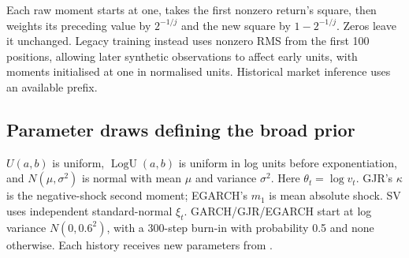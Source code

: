 Each raw moment starts at one, takes the first nonzero return's square, then weights its preceding value by $2^{-1/j}$ and the new square by $1-2^{-1/j}$. Zeros leave it unchanged. Legacy training instead uses nonzero RMS from the first 100 positions, allowing later synthetic observations to affect early units, with moments initialised at one in normalised units. Historical market inference uses an available prefix.

\subsection{Parameter draws defining the broad prior}

$U(a,b)$ is uniform, $\operatorname{LogU}(a,b)$ is uniform in log units before exponentiation, and $N(\mu,\sigma^2)$ is normal with mean $\mu$ and variance $\sigma^2$. Here $\theta_t=\log v_t$. GJR's $\kappa$ is the negative-shock second moment; EGARCH's $m_1$ is mean absolute shock. SV uses independent standard-normal $\xi_t$. GARCH/GJR/EGARCH start at log variance $N(0,0.6^2)$, with a 300-step burn-in with probability 0.5 and none otherwise. Each history receives new parameters from .

